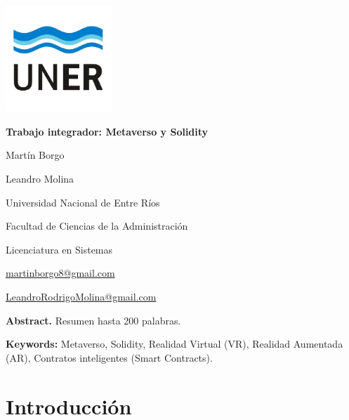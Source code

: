 \documentclass[a4paper,10pt]{article}
\begin{document}
	\pagestyle{empty}
	\begin{titlepage}
		\centering
		\vspace*{1.5cm}
		\includegraphics[width=0.3\textwidth]{unerlogo.png}
		\linebreak
		{\fontsize{14}{17}\bfseries Trabajo integrador: Metaverso y Solidity\par}
		{\small Martín Borgo\par}
		{\small Leandro Molina\par}
		{\normalsize Universidad Nacional de Entre Ríos\par}
		{\normalsize Facultad de Ciencias de la Administración\par}
		{\normalsize Licenciatura en Sistemas \par}
		{\small \href{mailto:martinborgo8@gmail.com}{martinborgo8@gmail.com}\par}
		{\small \href{mailto:LeandroRodrigoMolina@gmail.com}{LeandroRodrigoMolina@gmail.com}\par}
		
		{\small \textbf{Abstract.} Resumen hasta 200 palabras. \par}
		{\small \textbf{Keywords:} Metaverso, Solidity, Realidad Virtual (VR), Realidad Aumentada (AR), Contratos inteligentes (Smart Contracts).\par}
	\end{titlepage}
	
	\tableofcontents
	\thispagestyle{empty}
	\newpage
	\section{Introducción}
	 
\end{document}
